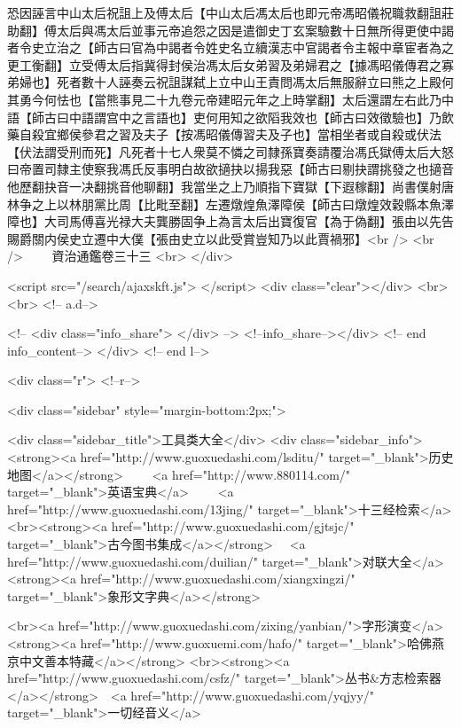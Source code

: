 恐因誣言中山太后祝詛上及傅太后【中山太后馮太后也即元帝馮昭儀祝職救翻詛莊助翻】傅太后與馮太后並事元帝追怨之因是遣御史丁玄案驗數十日無所得更使中謁者令史立治之【師古曰官為中謁者令姓史名立續漢志中官謁者令主報中章宦者為之更工衡翻】立受傅太后指冀得封侯治馮太后女弟習及弟婦君之【據馮昭儀傳君之寡弟婦也】死者數十人誣奏云祝詛謀弑上立中山王責問馮太后無服辭立曰熊之上殿何其勇今何怯也【當熊事見二十九卷元帝建昭元年之上時掌翻】太后還謂左右此乃中語【師古曰中語謂宫中之言語也】吏何用知之欲䧟我效也【師古曰效徵驗也】乃飲藥自殺宜鄉侯參君之習及夫子【按馮昭儀傳習夫及子也】當相坐者或自殺或伏法【伏法謂受刑而死】凡死者十七人衆莫不憐之司隸孫寶奏請覆治馮氏獄傅太后大怒曰帝置司隸主使察我馮氏反事明白故欲擿抉以揚我惡【師古曰剔抉謂挑發之也擿音他歷翻抉音一决翻挑音他聊翻】我當坐之上乃順指下寶獄【下遐稼翻】尚書僕射唐林争之上以林朋黨比周【比毗至翻】左遷燉煌魚澤障侯【師古曰燉煌效穀縣本魚澤障也】大司馬傅喜光禄大夫龔勝固争上為言太后出寶復官【為于偽翻】張由以先告賜爵關内侯史立遷中大僕【張由史立以此受賞豈知乃以此賈禍邪】<br />
<br />
　　資治通鑑卷三十三  <br>
   </div> 

<script src="/search/ajaxskft.js"> </script>
 <div class="clear"></div>
<br>
<br>
 <!-- a.d-->

 <!--
<div class="info_share">
</div> 
-->
 <!--info_share--></div>   <!-- end info_content-->
  </div> <!-- end l-->

<div class="r">   <!--r-->



<div class="sidebar"  style="margin-bottom:2px;">

 
<div class="sidebar_title">工具类大全</div>
<div class="sidebar_info">
<strong><a href="http://www.guoxuedashi.com/lsditu/" target="_blank">历史地图</a></strong>　　
<a href="http://www.880114.com/" target="_blank">英语宝典</a>　　
<a href="http://www.guoxuedashi.com/13jing/" target="_blank">十三经检索</a>　
<br><strong><a href="http://www.guoxuedashi.com/gjtsjc/" target="_blank">古今图书集成</a></strong>　
<a href="http://www.guoxuedashi.com/duilian/" target="_blank">对联大全</a>　<strong><a href="http://www.guoxuedashi.com/xiangxingzi/" target="_blank">象形文字典</a></strong>　

<br><a href="http://www.guoxuedashi.com/zixing/yanbian/">字形演变</a>　　<strong><a href="http://www.guoxuemi.com/hafo/" target="_blank">哈佛燕京中文善本特藏</a></strong>
<br><strong><a href="http://www.guoxuedashi.com/csfz/" target="_blank">丛书&方志检索器</a></strong>　<a href="http://www.guoxuedashi.com/yqjyy/" target="_blank">一切经音义</a>　　

